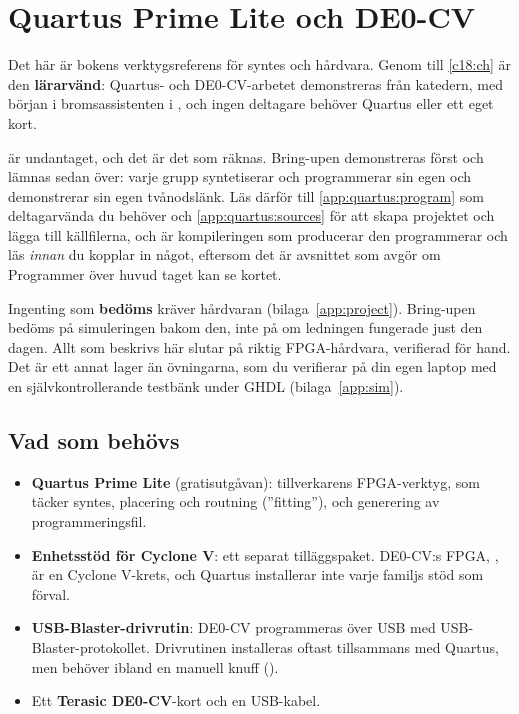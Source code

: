 
\chapter{Quartus Prime Lite och DE0-CV}
\label{app:quartus}

Det här är bokens verktygsreferens för syntes och hårdvara. Genom  till \ref{c18:ch}
är den \textbf{lärarvänd}: Quartus- och DE0-CV-arbetet demonstreras från katedern, med början i
bromsassistenten i , och ingen deltagare behöver Quartus eller ett eget kort.

\begin{aside}
 är undantaget, och det är det som räknas. Bring-upen demonstreras först och lämnas
sedan över: varje grupp syntetiserar och programmerar sin egen  och demonstrerar
sin egen tvånodslänk. Läs därför  till \ref{app:quartus:program} som
deltagarvända \textemdash{} du behöver  och \ref{app:quartus:sources} för
att skapa projektet och lägga till källfilerna, och  är kompileringen som
producerar den   programmerar \textemdash{} och läs
 \emph{innan} du kopplar in något, eftersom det är avsnittet som avgör om
Programmer över huvud taget kan se kortet.
\end{aside}

Ingenting som \textbf{bedöms} kräver hårdvaran (bilaga~\ref{app:project}). Bring-upen bedöms på
simuleringen bakom den, inte på om ledningen fungerade just den dagen. Allt som beskrivs här slutar
på riktig FPGA-hårdvara, verifierad för hand. Det är ett annat lager än övningarna, som du verifierar
på din egen laptop med en självkontrollerande testbänk under GHDL (bilaga~\ref{app:sim}).

\section{Vad som behövs}
\label{app:quartus:need}

\begin{itemize}
  \item \textbf{Quartus Prime Lite} (gratisutgåvan): tillverkarens FPGA-verktyg, som täcker syntes,
    placering och routning (”fitting”), och generering av programmeringsfil.
  \item \textbf{Enhetsstöd för Cyclone V}: ett separat tilläggspaket. DE0-CV:s FPGA,
    , är en Cyclone V-krets, och Quartus installerar inte varje familjs stöd som
    förval.
  \item \textbf{USB-Blaster-drivrutin}: DE0-CV programmeras över USB med USB-Blaster-protokollet.
    Drivrutinen installeras oftast tillsammans med Quartus, men behöver ibland en manuell knuff
    ().
  \item Ett \textbf{Terasic DE0-CV}-kort och en USB-kabel.
\end{itemize}

